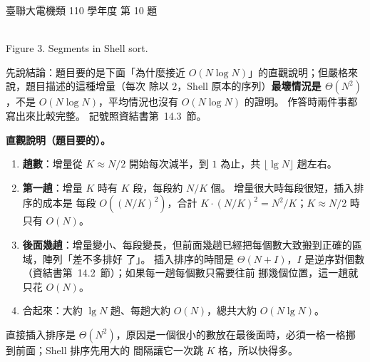 \begin{pastexam}[label={px:ust-110-ee-ds-10}]{臺聯大電機類 110 學年度 第 10 題}
\begin{center}
\\[2pt] Figure 3. Segments in Shell sort.\end{center}
\end{pastexam}

\begin{pastsoln}
先說結論：題目要的是下面「為什麼接近 $O(N \log N)$」的直觀說明；但嚴格來說，題目描述的這種增量（每次
除以 $2$，Shell 原本的序列）\textbf{最壞情況是 $\Theta(N^2)$}，不是 $O(N \log N)$，平均情況也沒有
$O(N \log N)$ 的證明。 作答時兩件事都寫出來比較完整。 記號照資結書第~14.3~節。

\textbf{直觀說明（題目要的）。}
\begin{enumerate}
\item \textbf{趟數}：增量從 $K \approx N/2$ 開始每次減半，到 $1$ 為止，共 $\lfloor \lg N \rfloor$ 趟左右。
\item \textbf{第一趟}：增量 $K$ 時有 $K$ 段，每段約 $N/K$ 個。 增量很大時每段很短，插入排序的成本是
每段 $O((N/K)^2)$，合計 $K \cdot (N/K)^2 = N^2/K$；$K \approx N/2$ 時只有 $O(N)$。
\item \textbf{後面幾趟}：增量變小、每段變長，但前面幾趟已經把每個數大致搬到正確的區域，陣列「差不多排好
了」。 插入排序的時間是 $\Theta(N + I)$，$I$ 是逆序對個數（資結書第~14.2~節）；如果每一趟每個數只需要往前
挪幾個位置，這一趟就只花 $O(N)$。
\item 合起來：大約 $\lg N$ 趟、每趟大約 $O(N)$，總共大約 $O(N \lg N)$。
\end{enumerate}
直接插入排序是 $\Theta(N^2)$，原因是一個很小的數放在最後面時，必須一格一格挪到前面；Shell 排序先用大的
間隔讓它一次跳 $K$ 格，所以快得多。


\end{pastsoln}
